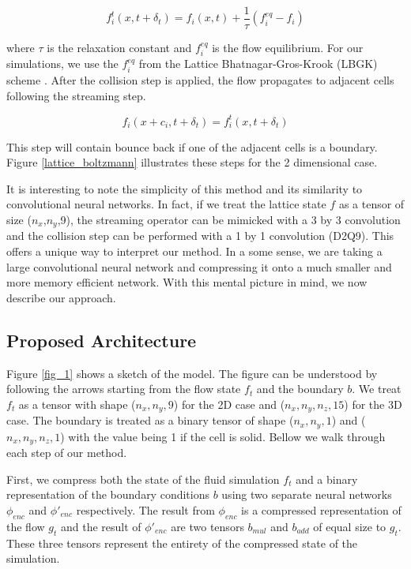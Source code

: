 \documentclass{article}
\begin{document}
\begin{equation}
  f^t_i(x, t + \delta_t) = f_i(x,t) + \frac{1}{\tau} (f_i^{eq} - f_i)
\end{equation}

where $\tau$ is the relaxation constant and $f_i^{eq}$ is the flow equilibrium. For our simulations, we use the $f_i^{eq}$ from the Lattice Bhatnagar-Gros-Krook (LBGK) scheme \cite{guo2013lattice}. After the collision step is applied, the flow propagates to adjacent cells following the streaming step. 

\begin{equation}
  f_i(x + c_i, t + \delta_t) = f^t_i(x,t + \delta_t)
\end{equation}

This step will contain bounce back if one of the adjacent cells is a boundary. Figure \ref{lattice_boltzmann} illustrates these steps for the 2 dimensional case.

It is interesting to note the simplicity of this method and its similarity to convolutional neural networks. In fact, if we treat the lattice state $f$ as a tensor of size ($n_x$,$n_y$,9), the streaming operator can be mimicked with a 3 by 3 convolution and the collision step can be performed with a 1 by 1 convolution (D2Q9). This offers a unique way to interpret our method. In a some sense, we are taking a large convolutional neural network and compressing it onto a much smaller and more memory efficient network. With this mental picture in mind, we now describe our approach.

\subsection{Proposed Architecture}

Figure \ref{fig_1} shows a sketch of the model. The figure can be understood by following the arrows starting from the flow state $f_t$ and the boundary $b$. We treat $f_t$ as a tensor with shape ($n_x,n_y,9$) for the 2D case and ($n_x,n_y,n_z,15$) for the 3D case. The boundary is treated as a binary tensor of shape ($n_x,n_y,1$) and ($n_x,n_y,n_z,1$) with the value being 1 if the cell is solid. Bellow we walk through each step of our method.

First, we compress both the state of the fluid simulation $f_t$ and a binary representation of the boundary conditions $b$ using two separate neural networks $\phi_{enc}$ and $\phi'_{enc}$ respectively. The result from $\phi_{enc}$ is a compressed representation of the flow $g_t$ and the result of $\phi'_{enc}$ are two tensors $b_{mul}$ and $b_{add}$ of equal size to $g_t$. These three tensors represent the entirety of the compressed state of the simulation.
\end{document}
